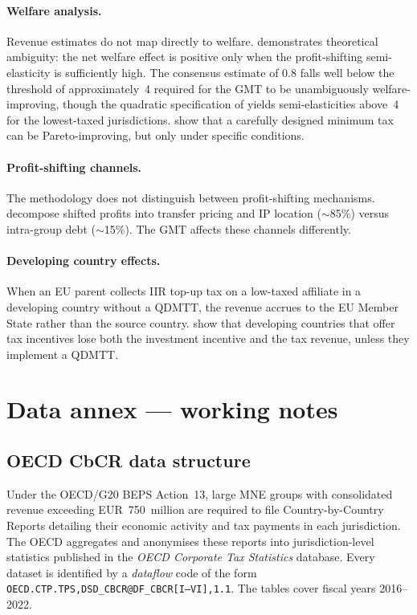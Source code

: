 \documentclass[11pt,a4paper]{article}
\newcommand{\code}[1]{\texttt{#1}}
\begin{document}
\paragraph{Welfare analysis.} Revenue estimates do not map directly to welfare. \citet{johannesen2022} demonstrates theoretical ambiguity: the net welfare effect is positive only when the profit-shifting semi-elasticity is sufficiently high. The consensus estimate of 0.8 falls well below the threshold of approximately~4 required for the GMT to be unambiguously welfare-improving, though the quadratic specification of \citet{dowd2017} yields semi-elasticities above~4 for the lowest-taxed jurisdictions. \citet{hebous2023} show that a carefully designed minimum tax can be Pareto-improving, but only under specific conditions.

\paragraph{Profit-shifting channels.} The methodology does not distinguish between profit-shifting mechanisms. \citet{torslov2023} decompose shifted profits into transfer pricing and IP location ($\sim$85\%) versus intra-group debt ($\sim$15\%). The GMT affects these channels differently.

\paragraph{Developing country effects.} When an EU parent collects IIR top-up tax on a low-taxed affiliate in a developing country without a QDMTT, the revenue accrues to the EU Member State rather than the source country. \citet{riet2025} show that developing countries that offer tax incentives lose both the investment incentive and the tax revenue, unless they implement a QDMTT.

\section{Data annex --- working notes}\label{w:data}

\subsection{OECD CbCR data structure}

Under the OECD/G20 BEPS Action~13, large MNE groups with consolidated revenue exceeding EUR~750~million are required to file Country-by-Country Reports detailing their economic activity and tax payments in each jurisdiction. The OECD aggregates and anonymises these reports into jurisdiction-level statistics published in the \emph{OECD Corporate Tax Statistics} database. Every dataset is identified by a \emph{dataflow} code of the form \code{OECD.CTP.TPS,DSD\_CBCR@DF\_CBCR[I--VI],1.1}. The tables cover fiscal years 2016--2022.
\end{document}
